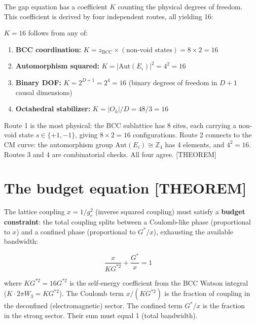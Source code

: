 \documentclass[
  11pt,
  letterpaper,
  twoside,
  openany]{book}
\makeatletter
\providecommand{\tightlist}{%
  \setlength{\itemsep}{0pt}\setlength{\parskip}{0pt}}
\let\orig@section\section
\renewcommand{\section}{\needspace{8\baselineskip}\orig@section}
\newcommand{\Gs}{G^{*}{}}
\newcommand{\Gssq}{G^{*2}{}}      %
\makeatother
\begin{document}
The gap equation has a coefficient \(K\) counting the physical degrees
of freedom. This coefficient is derived by four independent routes, all
yielding 16:

\begin{ftdtheorem}

\(K = 16\) follows from any of:

\begin{enumerate}
\def\labelenumi{\arabic{enumi}.}
\tightlist
\item
  \textbf{BCC coordination:}
  \(K = z_{\text{BCC}} \times (\text{non-void states}) = 8 \times 2 = 16\)
\item
  \textbf{Automorphism squared:} \(K = |\text{Aut}(E_i)|^2 = 4^2 = 16\)
\item
  \textbf{Binary DOF:} \(K = 2^{D+1} = 2^4 = 16\) (binary degrees of
  freedom in \(D+1\) causal dimensions)
\item
  \textbf{Octahedral stabilizer:} \(K = |O_h|/D = 48/3 = 16\)
\end{enumerate}

\end{ftdtheorem}

Route 1 is the most physical: the BCC sublattice has 8 sites, each
carrying a non-void state \(s \in \{+1, -1\}\), giving
\(8 \times 2 = 16\) configurations. Route 2 connects to the CM curve:
the automorphism group \(\text{Aut}(E_i) \cong \mathbb{Z}_4\) has 4
elements, and \(4^2 = 16\). Routes 3 and 4 are combinatorial checks. All
four agree. {[}THEOREM{]}

\section{The budget equation
{[}THEOREM{]}}\label{the-budget-equation-theorem}

The lattice coupling \(x = 1/g_c^2\) (inverse squared coupling) must
satisfy a \textbf{budget constraint}: the total coupling splits between
a Coulomb-like phase (proportional to \(x\)) and a confined phase
(proportional to \(\Gs/x\)), exhausting the available bandwidth:

\[
\frac{x}{K\Gssq} + \frac{\Gs}{x} = 1
\tag{8.1}
\]

where \(K\Gssq = 16\Gssq\) is the self-energy coefficient from the BCC
Watson integral (\(K \cdot 2\pi W_3 = K\Gssq\)). The Coulomb term
\(x/(K\Gssq)\) is the fraction of coupling in the deconfined
(electromagnetic) sector. The confined term \(\Gs/x\) is the fraction in
the strong sector. Their sum must equal 1 (total bandwidth).
\end{document}
